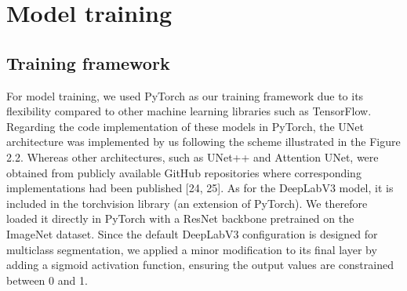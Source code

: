 \chapter{Model training}
\section{Training framework}
For model training, we used PyTorch as our training framework due to its flexibility compared to other machine learning libraries such as TensorFlow. Regarding the code implementation of these models in PyTorch, the UNet architecture was implemented by us following the scheme illustrated in the Figure 2.2. Whereas other architectures, such as UNet++ and Attention UNet, were obtained from publicly available GitHub repositories where corresponding implementations had been published [24, 25]. As for the DeepLabV3 model, it is included in the torchvision library (an extension of PyTorch). We therefore loaded it directly in PyTorch with a ResNet backbone pretrained on the ImageNet dataset. Since the default DeepLabV3 configuration is designed for multiclass segmentation, we applied a minor modification to its final layer by adding a sigmoid activation function, ensuring the output values are constrained between 0 and 1.\\


